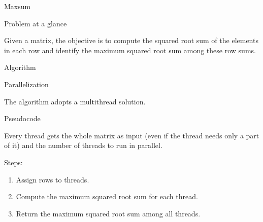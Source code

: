 \begin{chapter}{Maxsum}
    \begin{section}{Problem at a glance}
        \par Given a matrix, the objective is to compute the squared root sum of the elements in each row and identify the maximum squared root sum among these row sums.
    \end{section}
    \begin{section}{Algorithm}
        \begin{subsection}{Parallelization}
            \par The algorithm adopts a multithread solution.
        \end{subsection}
        \begin{subsection}{Pseudocode}
            \par Every thread gets the whole matrix as input (even if the thread needs only a part of it) and the number of threads to run in parallel.
            \par Steps:
            \begin{enumerate}
                \item Assign rows to threads.
                \item Compute the maximum squared root sum for each thread.
                \item Return the maximum squared root sum among all threads.
            \end{enumerate}
            
        \end{subsection}
    \end{section}
\end{chapter}